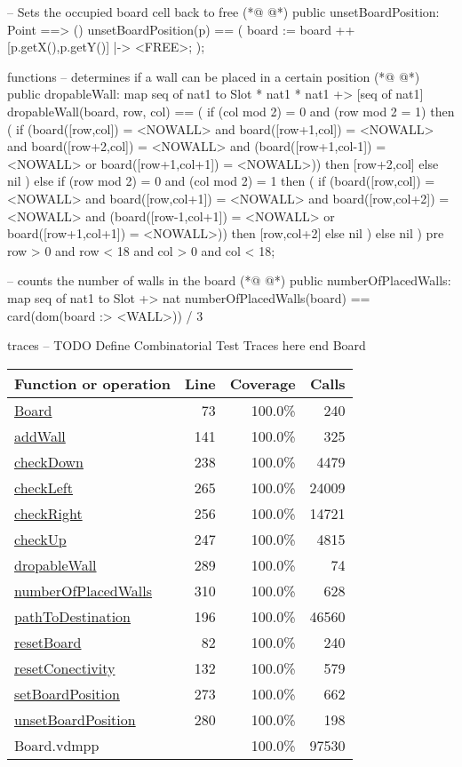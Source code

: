 \begin{vdmpp}[breaklines=true]
  -- Sets the occupied board cell back to free
(*@
\label{unsetBoardPosition:280}
@*)
  public unsetBoardPosition: Point ==> ()
  unsetBoardPosition(p) ==
  (
   board := board ++ {[p.getX(),p.getY()]  |-> <FREE>}; 
  );
  
  
functions
  -- determines if a wall can be placed in a certain position
(*@
\label{dropableWall:289}
@*)
  public dropableWall: map seq of nat1 to Slot * nat1 * nat1 +> [seq of nat1]
  dropableWall(board, row, col) == 
  (
   if (col mod 2) = 0 and (row mod 2 = 1)
   then (
    if (board([row,col]) = <NOWALL> and board([row+1,col]) = <NOWALL> and board([row+2,col]) = <NOWALL> and (board([row+1,col-1]) = <NOWALL> or board([row+1,col+1]) = <NOWALL>)) 
    then [row+2,col]
    else nil
   )
   else 
   if (row mod 2) = 0 and (col mod 2) = 1
   then (
    if (board([row,col]) = <NOWALL> and board([row,col+1]) = <NOWALL> and board([row,col+2]) = <NOWALL> and (board([row-1,col+1]) = <NOWALL> or board([row+1,col+1]) = <NOWALL>))
    then [row,col+2]
    else nil
   )
   else nil
  )
  pre row > 0 and row < 18 and col > 0 and col < 18;
  
  -- counts the number of walls in the board
(*@
\label{numberOfPlacedWalls:310}
@*)
  public numberOfPlacedWalls: map seq of nat1 to Slot +> nat
  numberOfPlacedWalls(board) ==
  card(dom(board :> {<WALL>})) / 3
 
traces
-- TODO Define Combinatorial Test Traces here  
end Board
\end{vdmpp}
\bigskip
\begin{longtable}{|l|r|r|r|}
\hline
Function or operation & Line & Coverage & Calls \\
\hline
\hline
\hyperref[Board:73]{Board} & 73&100.0\% & 240 \\
\hline
\hyperref[addWall:141]{addWall} & 141&100.0\% & 325 \\
\hline
\hyperref[checkDown:238]{checkDown} & 238&100.0\% & 4479 \\
\hline
\hyperref[checkLeft:265]{checkLeft} & 265&100.0\% & 24009 \\
\hline
\hyperref[checkRight:256]{checkRight} & 256&100.0\% & 14721 \\
\hline
\hyperref[checkUp:247]{checkUp} & 247&100.0\% & 4815 \\
\hline
\hyperref[dropableWall:289]{dropableWall} & 289&100.0\% & 74 \\
\hline
\hyperref[numberOfPlacedWalls:310]{numberOfPlacedWalls} & 310&100.0\% & 628 \\
\hline
\hyperref[pathToDestination:196]{pathToDestination} & 196&100.0\% & 46560 \\
\hline
\hyperref[resetBoard:82]{resetBoard} & 82&100.0\% & 240 \\
\hline
\hyperref[resetConectivity:132]{resetConectivity} & 132&100.0\% & 579 \\
\hline
\hyperref[setBoardPosition:273]{setBoardPosition} & 273&100.0\% & 662 \\
\hline
\hyperref[unsetBoardPosition:280]{unsetBoardPosition} & 280&100.0\% & 198 \\
\hline
\hline
Board.vdmpp & & 100.0\% & 97530 \\
\hline
\end{longtable}

